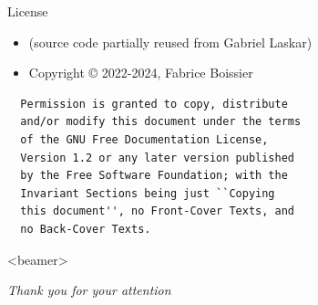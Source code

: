 \documentclass[12pt,a4paper]{beamer}
\begin{document}
\frame[plain]{\titlepage}

\newpage


\begin{frame}{License}

  \begin{itemize}
    \item (\latex source code partially reused from Gabriel Laskar)
    \item Copyright \copyright{} 2022-2024, Fabrice Boissier
  \end{itemize}

  \begin{verbatim}
  Permission is granted to copy, distribute
  and/or modify this document under the terms
  of the GNU Free Documentation License,
  Version 1.2 or any later version published
  by the Free Software Foundation; with the
  Invariant Sections being just ``Copying
  this document'', no Front-Cover Texts, and
  no Back-Cover Texts.
  \end{verbatim}

\end{frame}

















\begin{frame}<beamer>{}

  \begin{center}
  \textit{Thank you for your attention}
  \end{center}

\end{frame}
\end{document}
